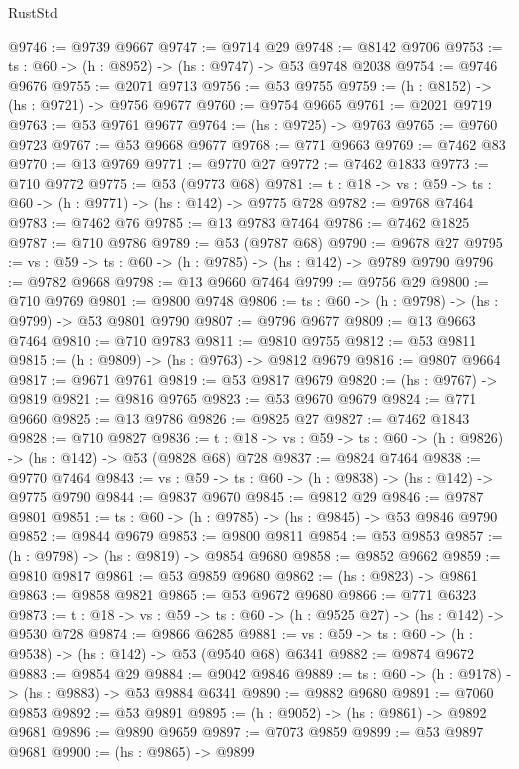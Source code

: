 \begin{lexlean}{RustStd}
\begin{coremodule}
@9746 := @9739 @9667
@9747 := @9714 @29
@9748 := @8142 @9706
@9753 := {ts : @60} -> (h : @8952) -> (hs : @9747) -> @53 @9748 @2038
@9754 := @9746 @9676
@9755 := @2071 @9713
@9756 := @53 @9755
@9759 := (h : @8152) -> (hs : @9721) -> @9756 @9677
@9760 := @9754 @9665
@9761 := @2021 @9719
@9763 := @53 @9761 @9677
@9764 := (hs : @9725) -> @9763
@9765 := @9760 @9723
@9767 := @53 @9668 @9677
@9768 := @771 @9663
@9769 := @7462 @83
@9770 := @13 @9769
@9771 := @9770 @27
@9772 := @7462 @1833
@9773 := @710 @9772
@9775 := @53 (@9773 @68)
@9781 := {t : @18} -> {vs : @59} -> {ts : @60} -> (h : @9771) -> (hs : @142) -> @9775 @728
@9782 := @9768 @7464
@9783 := @7462 @76
@9785 := @13 @9783 @7464
@9786 := @7462 @1825
@9787 := @710 @9786
@9789 := @53 (@9787 @68)
@9790 := @9678 @27
@9795 := {vs : @59} -> {ts : @60} -> (h : @9785) -> (hs : @142) -> @9789 @9790
@9796 := @9782 @9668
@9798 := @13 @9660 @7464
@9799 := @9756 @29
@9800 := @710 @9769
@9801 := @9800 @9748
@9806 := {ts : @60} -> (h : @9798) -> (hs : @9799) -> @53 @9801 @9790
@9807 := @9796 @9677
@9809 := @13 @9663 @7464
@9810 := @710 @9783
@9811 := @9810 @9755
@9812 := @53 @9811
@9815 := (h : @9809) -> (hs : @9763) -> @9812 @9679
@9816 := @9807 @9664
@9817 := @9671 @9761
@9819 := @53 @9817 @9679
@9820 := (hs : @9767) -> @9819
@9821 := @9816 @9765
@9823 := @53 @9670 @9679
@9824 := @771 @9660
@9825 := @13 @9786
@9826 := @9825 @27
@9827 := @7462 @1843
@9828 := @710 @9827
@9836 := {t : @18} -> {vs : @59} -> {ts : @60} -> (h : @9826) -> (hs : @142) -> @53 (@9828 @68) @728
@9837 := @9824 @7464
@9838 := @9770 @7464
@9843 := {vs : @59} -> {ts : @60} -> (h : @9838) -> (hs : @142) -> @9775 @9790
@9844 := @9837 @9670
@9845 := @9812 @29
@9846 := @9787 @9801
@9851 := {ts : @60} -> (h : @9785) -> (hs : @9845) -> @53 @9846 @9790
@9852 := @9844 @9679
@9853 := @9800 @9811
@9854 := @53 @9853
@9857 := (h : @9798) -> (hs : @9819) -> @9854 @9680
@9858 := @9852 @9662
@9859 := @9810 @9817
@9861 := @53 @9859 @9680
@9862 := (hs : @9823) -> @9861
@9863 := @9858 @9821
@9865 := @53 @9672 @9680
@9866 := @771 @6323
@9873 := {t : @18} -> {vs : @59} -> {ts : @60} -> (h : @9525 @27) -> (hs : @142) -> @9530 @728
@9874 := @9866 @6285
@9881 := {vs : @59} -> {ts : @60} -> (h : @9538) -> (hs : @142) -> @53 (@9540 @68) @6341
@9882 := @9874 @9672
@9883 := @9854 @29
@9884 := @9042 @9846
@9889 := {ts : @60} -> (h : @9178) -> (hs : @9883) -> @53 @9884 @6341
@9890 := @9882 @9680
@9891 := @7060 @9853
@9892 := @53 @9891
@9895 := (h : @9052) -> (hs : @9861) -> @9892 @9681
@9896 := @9890 @9659
@9897 := @7073 @9859
@9899 := @53 @9897 @9681
@9900 := (hs : @9865) -> @9899

\end{coremodule}
\end{lexlean}
